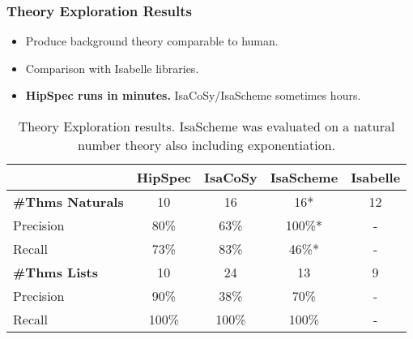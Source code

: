 \documentclass[serif,professionalfont]{beamer}
\newcommand\hs[1]{\texttt{#1}}
\begin{document}
\begin{frame}


\frametitle{Theory Exploration Results}
\begin{itemize}
\item Produce background theory comparable to human.
\item Comparison with Isabelle libraries.
\item \textbf{HipSpec runs in minutes.} IsaCoSy/IsaScheme sometimes hours.
\end{itemize}
 \begin{table}[htd]
\begin{center}
\begin{tabular}{l|c|c|c||c}
                           & HipSpec & IsaCoSy & IsaScheme & Isabelle\\
 \hline
 \textbf{\#Thms Naturals}  & 10      & 16      & 16*       & 12\\
 \hline
  Precision                & 80\%    & 63\%    & 100\%*    & -\\
  Recall                   & 73\%    & 83\%    & 46\%*     & -\\
\hline
 \textbf{\#Thms Lists}     & 10      & 24      & 13        & 9 \\
  \hline
  Precision                & 90\%    & 38\%    & 70\%      & -\\
  Recall                   & 100\%   & 100\%   & 100\%     & -\\
\end{tabular}
\end{center}
\caption{Theory Exploration results. IsaScheme was evaluated on a natural number theory also including exponentiation.}
\label{tab:expl}
\end{table}%

\end{frame}

%
%
%

\end{document}
